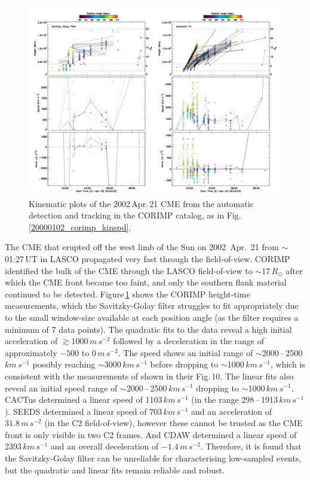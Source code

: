 \documentclass[referee,a4paper,12pt,traditabstract]{swsc}
\begin{document}
\begin{figure}[t]
\centerline{\includegraphics[width=\linewidth]{20020421_corimp_kinspd.pdf}}
\caption{Kinematic plots of the 2002\,Apr.\,21 CME from the automatic detection and tracking in the CORIMP catalog, as in Fig.\,\ref{20000102_corimp_kinspd}.}
\label{20020421_corimp_kinspd}
\end{figure}


The CME that erupted off the west limb of the Sun on 2002~Apr.~21 from $\sim$01:27\,UT in LASCO propagated very fast through the field-of-view. CORIMP identified the bulk of the CME through the LASCO field-of-view to $\sim$17\,$R_\odot$ after which the CME front became too faint, and only the southern flank material continued to be detected. Figure\,\ref{20020421_corimp_kinspd} shows the CORIMP height-time measurements, which the Savitzky-Golay filter struggles to fit appropriately due to the small window-size available at each position angle (as the filter requires a minimum of 7 data points). The quadratic fits to the data reveal a high initial acceleration of $\gtrsim$1000\,$m\,s^{-2}$ followed by a deceleration in the range of approximately $-500$ to $0\,m\,s^{-2}$. The speed shows an initial range of $\sim$2000\,--\,2500\,$km\,s^{-1}$ possibly reaching $\sim$3000\,$km\,s^{-1}$ before dropping to $\sim$1000\,$km\,s^{-1}$, which is consistent with the measurements of \cite{2009A&A...495..325B} shown in their Fig.\,10. The linear fits also reveal an initial speed range of $\sim$2000\,--\,2500\,$km\,s^{-1}$ dropping to $\sim$1000\,$km\,s^{-1}$. CACTus determined a linear speed of 1103$\,km\,s^{-1}$ (in the range 298\,--\,1913\,$km\,s^{-1}$). SEEDS determined a linear speed of 703\,$km\,s^{-1}$ and an acceleration of $31.8\,m\,s^{-2}$ (in the C2 field-of-view), however these cannot be trusted as the CME front is only visible in two C2 frames. And CDAW determined a linear speed of 2393$\,km\,s^{-1}$ and an overall deceleration of $-1.4\,m\,s^{-2}$. Therefore, it is found that the Savitzky-Golay filter can be unreliable for characterising low-sampled events, but the quadratic and linear fits remain reliable and robust.
\end{document}
